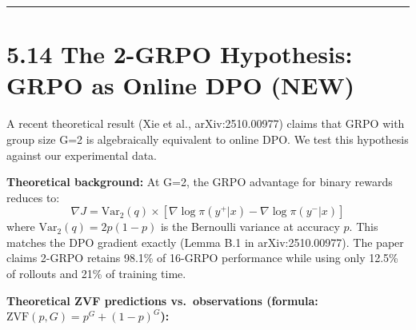 \documentclass[
  american,
  11pt,
  a4paper,
  oneside]{report}
\begin{document}
\begin{center}\rule{0.5\linewidth}{0.5pt}\end{center}

\section{5.14 The 2-GRPO Hypothesis: GRPO as Online DPO
(NEW)}\label{the-2-grpo-hypothesis-grpo-as-online-dpo-new}

A recent theoretical result (Xie et al., arXiv:2510.00977) claims that
GRPO with group size G=2 is algebraically equivalent to online DPO. We
test this hypothesis against our experimental data.

\textbf{Theoretical background:} At G=2, the GRPO advantage for binary
rewards reduces to: \[
\nabla J = \text{Var}_2(q) \times [\nabla \log \pi(y^+|x) - \nabla \log \pi(y^-|x)]
\] where \(\text{Var}_2(q) = 2p(1-p)\) is the Bernoulli variance at
accuracy \(p\). This matches the DPO gradient exactly (Lemma B.1 in
arXiv:2510.00977). The paper claims 2-GRPO retains 98.1\% of 16-GRPO
performance while using only 12.5\% of rollouts and 21\% of training
time.

\textbf{Theoretical ZVF predictions vs.~observations (formula:
\(\text{ZVF}(p, G) = p^G + (1-p)^G\)):}
\end{document}
